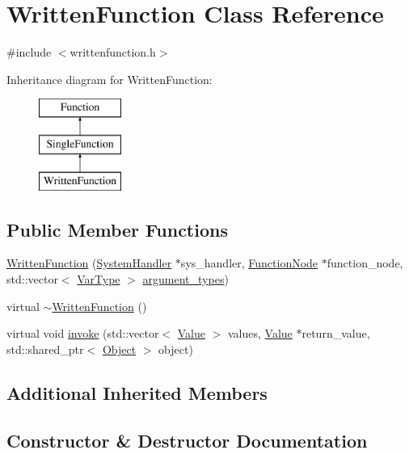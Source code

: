 \hypertarget{classWrittenFunction}{}\section{Written\+Function Class Reference}
\label{classWrittenFunction}


{\ttfamily \#include $<$writtenfunction.\+h$>$}

Inheritance diagram for Written\+Function\+:\begin{figure}[H]
\begin{center}
\leavevmode
\includegraphics[height=3.000000cm]{classWrittenFunction}
\end{center}
\end{figure}
\subsection*{Public Member Functions}
\begin{DoxyCompactItemize}
\item 
\hyperlink{classWrittenFunction_a99144af49957db65439e850306c97a8d}{Written\+Function} (\hyperlink{classSystemHandler}{System\+Handler} $\ast$sys\+\_\+handler, \hyperlink{classFunctionNode}{Function\+Node} $\ast$function\+\_\+node, std\+::vector$<$ \hyperlink{classVarType}{Var\+Type} $>$ \hyperlink{classSingleFunction_a345cc7c6a42587a62495688af6644a26}{argument\+\_\+types})
\item 
virtual \hyperlink{classWrittenFunction_a46facc10f998146c7709772b0b662ad6}{$\sim$\+Written\+Function} ()
\item 
virtual void \hyperlink{classWrittenFunction_afe56e5eb6a13f6e38ab5ec87e371d745}{invoke} (std\+::vector$<$ \hyperlink{classValue}{Value} $>$ values, \hyperlink{classValue}{Value} $\ast$return\+\_\+value, std\+::shared\+\_\+ptr$<$ \hyperlink{classObject}{Object} $>$ object)
\end{DoxyCompactItemize}
\subsection*{Additional Inherited Members}


\subsection{Constructor \& Destructor Documentation}
\mbox{\label{classWrittenFunction_a99144af49957db65439e850306c97a8d}} 
